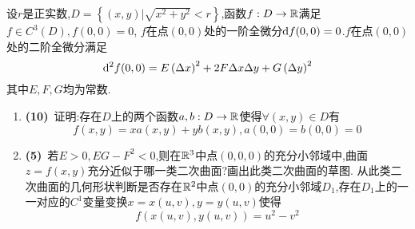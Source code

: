 \documentclass{ctexart}
\begin{document}
\begin{problem}[9.(15\songti{分})]
    设$r$是正实数,$D=\left\{(x,y)\vert\sqrt{x^2+y^2}<r\right\}$,函数$f:D\to\mathbb{R}$满足$f\in C^3(D),f(0,0)=0$,
    $f$在点$(0,0)$处的一阶全微分$\mathrm{d} f(0,0)=0$.$f$在点$(0,0)$处的二阶全微分满足
    $$\mathrm{d}^2f(0,0)=E\left(\Delta x\right)^2+2F\Delta x\Delta y+G\left(\Delta y\right)^2$$
    其中$E,F,G$均为常数.
    \begin{enumerate}[label=\textbf{(\arabic*)},leftmargin=*]
        \item \textbf{(10)}\ 证明:存在$D$上的两个函数$a,b:D\to\mathbb{R}$使得$\forall (x,y)\in D$有$$f(x,y)=xa(x,y)+yb(x,y),a(0,0)=b(0,0)=0$$
        \item \textbf{(5)}\ 若$E>0,EG-F^2<0$,则在$\mathbb{R}^3$中点$(0,0,0)$的充分小邻域中,曲面$z=f(x,y)$充分近似于哪一类二次曲面?画出此类二次曲面的草图.
            从此类二次曲面的几何形状判断是否存在$\mathbb{R}^2$中点$(0,0)$的充分小邻域$D_1$,存在$D_1$上的一一对应的$C^1$变量变换$x=x(u,v),y=y(u,v)$使得
            $$f(x(u,v),y(u,v))=u^2-v^2$$
    \end{enumerate}
\end{problem}
\end{document}
